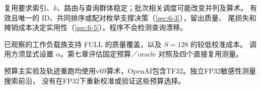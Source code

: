 复用要求索引、$k$、路由与查询群体稳定；批次相关调度可能改变并列及算术。
有效且唯一的 ID、共同排序或配对枚举支撑决策（\cref{sec:6-3}），留出质量、
尾损失和摊销成本决定实用性（\cref{sec:6-5}）。程序不会检测查询漂移。


已观察的工作负载族支持 FULL 的质量覆盖，以及 $S=128$ 的较低校准成本。
调用方须显式设置 $\alpha$。第七章评估固定预算／oracle 对照及四个直接复用测量。

预算主实验及轨迹重跑均使用v69算术，OpenAI包含TF32。独立FP32敏感性测量搜索前沿，
没有在FP32下重新校准或验证这些预算选择。
